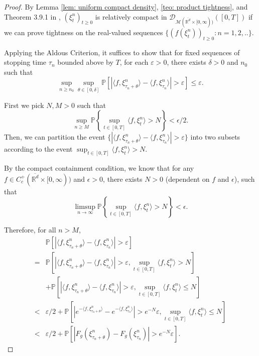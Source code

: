 \begin{proof}
By Lemma  \ref{lem: uniform compact density}, \ref{teo: product tightness}, and Theorem 3.9.1 in \cite{EK},
 $(\xi^n_t )_{t\geq 0}$ is relatively compact in $\mathcal{D}_{\mathcal{M}(\overline{\mathbb{R}^d} \times[0,\infty))}([0,T])$
 if we can prove tightness on the real-valued sequences
$\{(f(\xi^n_t))_{t \geq 0}: n=1,2,.. \}$.

Applying the Aldous Criterion, it suffices to show that
for fixed sequences of stopping time $\tau_n$ bounded above by $T$,
for each $\varepsilon>0$,
there exists $\delta > 0$ and $n_0$ such that
\begin{equation}
\sup_{n \geq n_0}\sup_{\theta \in [0, \delta]} \mathbb{P}\left[|\langle f, \xi^n_{\tau_n+\theta}\rangle - \langle f, \xi^n_{\tau_n}\rangle | > \varepsilon \right] \leq \varepsilon.
\end{equation}

First we pick $N,M>0$ such that 
 $$\sup_{n \geq M} \mathbb{P}\left\{ \sup_{t\in [0,T]}\langle f, \xi^n_t \rangle > N \right\} < \epsilon /2 .$$
Then, we can partition the event $\{|\langle f, \xi^n_{\tau_n+\theta}\rangle - \langle f, \xi^n_{\tau_n}\rangle | > \varepsilon\}$ into two subsets according to the event 
$ \sup_{t\in [0,T]}\langle f, \xi^n_t \rangle > N$.

By the compact containment condition, 
we know that for any $f \in C^{+}_{c}(\overline{\mathbb{R}^d} \times [0,\infty))$ and $\epsilon > 0$, there exists $N>0$ (dependent on $f$ and $\epsilon$), 
such that 
\begin{equation}
\label{eq: vague compact containment condition}
 \limsup_{n \to \infty} \mathbb{P}\left\{ \sup_{t\in [0,T]}\langle f, \xi^n_t \rangle > N \right\} < \epsilon.
\end{equation}

Therefore, for all $n>M$,
\begin{equation}
\begin{aligned}
 &\mathbb{P}\left[|\langle f, \xi^n_{\tau_n+\theta}\rangle - \langle f, \xi^n_{\tau_n}\rangle | > \varepsilon \right]\\
 =& \mathbb{P}\left[|\langle f, \xi^n_{\tau_n+\theta}\rangle - \langle f, \xi^n_{\tau_n}\rangle | > \varepsilon ,  \sup_{t\in [0,T]}\langle f, \xi^n_t \rangle > N \right]\\
 & + \mathbb{P}\left[|\langle f, \xi^n_{\tau_n+\theta}\rangle - \langle f, \xi^n_{\tau_n}\rangle | > \varepsilon,  \sup_{t\in [0,T]}\langle f, \xi^n_t \rangle \leq N \right]\\
< & \varepsilon/2 + \mathbb{P}\left[|e^{-\langle f, \xi^n_{\tau_n+\theta}\rangle} - e^{-\langle f, \xi^n_{\tau_n}\rangle }| > e^{-N}\varepsilon,  \sup_{t\in [0,T]}\langle f, \xi^n_t \rangle \leq N \right]\\
< & \varepsilon/2 + \mathbb{P}\left[|F_g(\xi^n_{\tau_n+\theta})-F_g(\xi^n_{\tau_n})| > e^{-N}\varepsilon\right].
\end{aligned}
\end{equation}


\end{proof}
